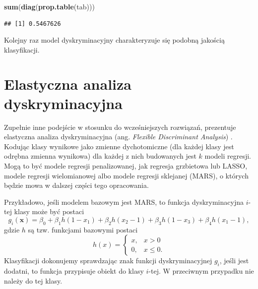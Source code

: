 \documentclass[
]{book}
\newenvironment{Shaded}{\begin{snugshade}}{\end{snugshade}}
\newcommand{\KeywordTok}[1]{\textcolor[rgb]{0.13,0.29,0.53}{\textbf{#1}}}
\newcommand{\NormalTok}[1]{#1}
\theoremstyle{plain}
\theoremstyle{definition}
\theoremstyle{definition}
\theoremstyle{definition}
\theoremstyle{definition}
\theoremstyle{remark}
\begin{document}
\begin{Shaded}
\begin{Highlighting}[]
\KeywordTok{sum}\NormalTok{(}\KeywordTok{diag}\NormalTok{(}\KeywordTok{prop.table}\NormalTok{(tab)))}
\end{Highlighting}
\end{Shaded}

\begin{verbatim}
## [1] 0.5467626
\end{verbatim}

Kolejny raz model dyskryminacyjny charakteryzuje się podobną jakością klasyfikacji.

\hypertarget{elastyczna-analiza-dyskryminacyjna}{%
\section{Elastyczna analiza dyskryminacyjna}\label{elastyczna-analiza-dyskryminacyjna}}

Zupełnie inne podejście w stosunku do wcześniejszych rozwiązań, prezentuje elastyczna analiza dyskryminacyjna (ang. \emph{Flexible Discriminant Analysis}) . Kodując klasy wynikowe jako zmienne dychotomiczne (dla każdej klasy jest odrębna zmienna wynikowa) dla każdej z nich budowanych jest \(k\) modeli regresji. Mogą to być modele regresji penalizowanej, jak regresja grzbietowa lub LASSO, modele regresji wielomianowej albo modele regresji sklejanej (MARS), o których będzie mowa w dalszej części tego opracowania.

Przykładowo, jeśli modelem bazowym jest MARS, to funkcja dyskryminacyjna \(i\)-tej klasy może być postaci
\begin{equation}
    g_i(\boldsymbol x)=\beta_0+\beta_1h(1-x_1)+\beta_2h(x_2-1)+\beta_3h(1-x_3)+\beta_4h(x_1-1),
\end{equation}
gdzie \(h\) są tzw. funkcjami bazowymi postaci
\begin{equation}
    h(x)= \begin{cases}
        x, & x> 0\\
        0, & x\leq 0.
    \end{cases}
\end{equation}
Klasyfikacji dokonujemy sprawdzając znak funkcji dyskryminacyjnej \(g_i\), jeśli jest dodatni, to funkcja przypisuje obiekt do klasy \(i\)-tej. W przeciwnym przypadku nie należy do tej klasy.
\end{document}
